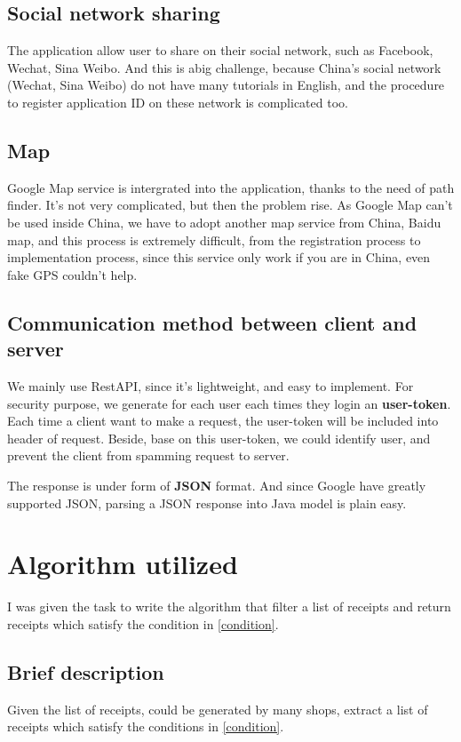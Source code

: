 \subsection{Social network sharing}
The application allow user to share on their social network, such as Facebook, Wechat, Sina Weibo. And this is abig challenge, because China's social network (Wechat, Sina Weibo) do not have many tutorials in English, and the procedure to register application ID on these network is complicated too. 

\subsection{Map}
Google Map service is intergrated into the application, thanks to the need of path finder. It's not very complicated, but then the problem rise. As Google Map can't be used inside China, we have to adopt another map service from China, Baidu map, and this process is extremely difficult, from the registration process to implementation process, since this service only work if you are in China, even fake GPS couldn't help.

\subsection{Communication method between client and server}
We mainly use RestAPI, since it's lightweight, and easy to implement. For security purpose, we generate for each user each times they login an \textbf{user-token}. Each time a client want to make a request, the user-token will be included into header of request. Beside, base on this user-token, we could identify user, and prevent the client from spamming request to server.

The response is under form of \textbf{JSON} format. And since Google have greatly supported JSON, parsing a JSON response into Java model is plain easy.  


\section{Algorithm utilized}

I was given the task to write the algorithm that filter a list of receipts and return receipts which satisfy the condition in  \ref{condition}. 

\subsection{Brief description}
Given the list of receipts, could be generated by many shops, extract a list of receipts which satisfy the conditions in \ref{condition}.


